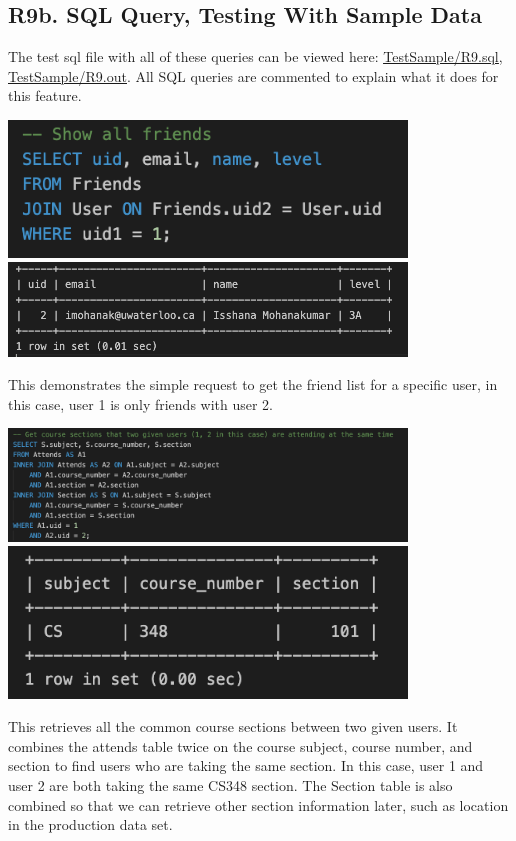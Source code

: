 \documentclass[12pt, a4paper]{article}
\begin{document}
\subsection*{R9b. SQL Query, Testing With Sample Data}
The test sql file with all of these queries can be viewed here: \underline{\href{https://github.com/Kggupta/DegreeMap/tree/main/Database/Queries/TestSample}{TestSample/R9.sql}}, \underline{\href{https://github.com/Kggupta/DegreeMap/tree/main/Database/Queries/TestSample}{TestSample/R9.out}}. All SQL queries are commented to explain what it does for this feature.

\begin{center}
    \includegraphics[width=400px]{R9/q1}
    \includegraphics[width=400px]{R9/q1out}
\end{center}
This demonstrates the simple request to get the friend list for a specific user, in this case, user 1 is only friends with user 2.
\begin{center}
    \includegraphics[width=400px]{R9/q2}
    \includegraphics[width=400px]{R9/q2out}
\end{center}
This retrieves all the common course sections between two given users. It combines the attends table twice on the course subject, course number, and section to find users who are taking the same section. In this case, user 1 and user 2 are both taking the same CS348 section. The Section table is also combined so that we can retrieve other section information later, such as location in the production data set.
\end{document}
